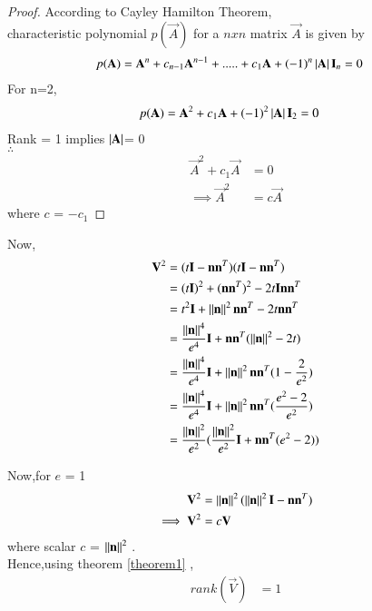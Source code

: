 \documentclass[journal,12pt,twocolumn]{IEEEtran}
\begin{document}
\begin{proof}
According to Cayley Hamilton Theorem,
\\
characteristic polynomial $p(\vec{A})$ for a  $nxn$ matrix $\vec{A}$ is given by
\begin{align}
    p(\mathbf{A}) &= \mathbf{A}^n + c_{n-1}\mathbf{A}^{n-1} + .....+ c_1\mathbf{A} + (-1)^n\left\vert\mathbf{A}\right\vert\mathbf{I}_n = 0
\end{align}
For n=2,
\begin{align}
    p(\mathbf{A}) &= \mathbf{A}^2 + c_1\mathbf{A} + (-1)^2\left\vert\mathbf{A}\right\vert\mathbf{I}_2=0
\end{align}
Rank = 1 implies $\left\vert\mathbf{A}\right\vert$= 0 
\\
$\therefore$
\begin{align}
    \vec{A}^2 + c_1\vec{A} &= 0
    \\
    \implies \vec{A}^2 &= c\vec{A}
\end{align}
where $c$ = $-c_1$
\end{proof}
Now,
\begin{align}
    \mathbf{V}^2 &= (t\mathbf{I}-\mathbf{n}\mathbf{n}^T)(t\mathbf{I}-\mathbf{n}\mathbf{n}^T) 
    \\
    &= (t\mathbf{I})^2 +(\mathbf{n}\mathbf{n}^T)^2 - 2t\mathbf{I}\mathbf{n}\mathbf{n}^T
    \\
    &= t^2\mathbf{I} + \left\lVert\mathbf{n}\right\rVert^2\mathbf{n}\mathbf{n}^T - 2t\mathbf{n}\mathbf{n}^T
    \\
    &= \frac{\left\lVert\mathbf{n}\right\rVert^4}{e^4}\mathbf{I} + \mathbf{n}\mathbf{n}^T(\left\lVert\mathbf{n}\right\rVert^2-2t)
    \\
    &= \frac{\left\lVert\mathbf{n}\right\rVert^4}{e^4}\mathbf{I} + \left\lVert\mathbf{n}\right\rVert^2\mathbf{n}\mathbf{n}^T(1-\frac{2}{e^2})
    \\
    &= \frac{\left\lVert\mathbf{n}\right\rVert^4}{e^4}\mathbf{I} + \left\lVert\mathbf{n}\right\rVert^2\mathbf{n}\mathbf{n}^T(\frac{e^2-2}{e^2})
    \\
    &= \frac{\left\lVert\mathbf{n}\right\rVert^2}{e^2}(\frac{\left\lVert\mathbf{n}\right\rVert^2}{e^2}\mathbf{I} + \mathbf{n}\mathbf{n}^T(e^2-2))
\end{align}

Now,for $e$ = 1
\begin{align}
    \mathbf{V}^2 &= \left\lVert\mathbf{n}\right\rVert^2(\left\lVert\mathbf{n}\right\rVert^2\mathbf{I} - \mathbf{n}\mathbf{n}^T)
    \\
    \implies \mathbf{V}^2 &= c\mathbf{V}
\end{align}
where scalar $c$ = $\left\lVert\mathbf{n}\right\rVert^2$ .
\\
Hence,using theorem \ref{theorem1} ,
\begin{align}
    rank(\vec{V}) &= 1
\end{align}
\end{document}

